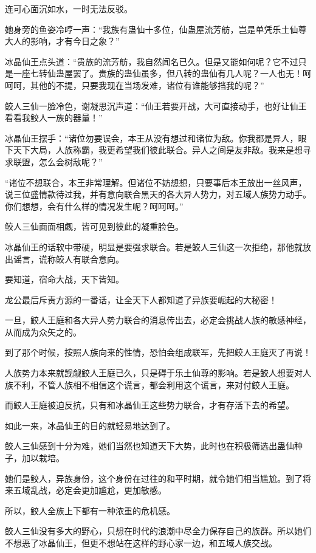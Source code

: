 \begin{this_body}
连可心面沉如水，一时无法反驳。

她身旁的鱼姿冷哼一声：“我族有蛊仙十多位，仙蛊屋流芳舫，岂是单凭乐土仙尊大人的影响，才有今日之象？”

冰晶仙王点头道：“贵族的流芳舫，我自然闻名已久。但是又能如何呢？它不过只是一座七转仙蛊屋罢了。贵族的蛊仙虽多，但八转的蛊仙有几人呢？一人也无！呵呵呵，其他的不提，只要我现在当场发难，诸位有谁能够挡我的呢？”

鲛人三仙一脸冷色，谢凝思沉声道：“仙王若要开战，大可直接动手，也好让仙王看看我鲛人一族的器量！”

冰晶仙王摆手：“诸位勿要误会，本王从没有想过和诸位为敌。你我都是异人，眼下天下大局，人族称霸，我更希望我们彼此联合。异人之间是友非敌。我来是想寻求联盟，怎么会树敌呢？”

“诸位不想联合，本王非常理解。但诸位不妨想想，只要事后本王放出一丝风声，说三位盛情款待过我，并有意向联合黑天的各大异人势力，对五域人族势力动手。你们想想，会有什么样的情况发生呢？呵呵呵。”

鲛人三仙面面相觑，皆可见到彼此的凝重脸色。

冰晶仙王的话软中带硬，明显是要强求联合。若是鲛人三仙这一次拒绝，那他就放出谣言，谎称鲛人有联合意向。

要知道，宿命大战，天下皆知。

龙公最后斥责方源的一番话，让全天下人都知道了异族要崛起的大秘密！

一旦，鲛人王庭和各大异人势力联合的消息传出去，必定会挑战人族的敏感神经，从而成为众矢之的。

到了那个时候，按照人族向来的性情，恐怕会组成联军，先把鲛人王庭灭了再说！

人族势力本来就觊觎鲛人王庭已久，只是碍于乐土仙尊的影响。若是鲛人想要对人族不利，不管人族相不相信这个谎言，都会利用这个谎言，来对付鲛人王庭。

而鲛人王庭被迫反抗，只有和冰晶仙王这些势力联合，才有存活下去的希望。

如此一来，冰晶仙王的目的就轻易地达到了。

鲛人三仙感到十分为难，她们当然也知道天下大势，此时也在积极筛选出蛊仙种子，加以栽培。

她们是鲛人，异族身份，这个身份在过往的和平时期，就令她们相当尴尬。到了将来五域乱战，必定会更加尴尬，更加敏感。

所以，鲛人全族上下都有一种浓重的危机感。

鲛人三仙没有多大的野心，只想在时代的浪潮中尽全力保存自己的族群。所以她们不想恶了冰晶仙王，但更不想站在这样的野心家一边，和五域人族交战。


\end{this_body}

